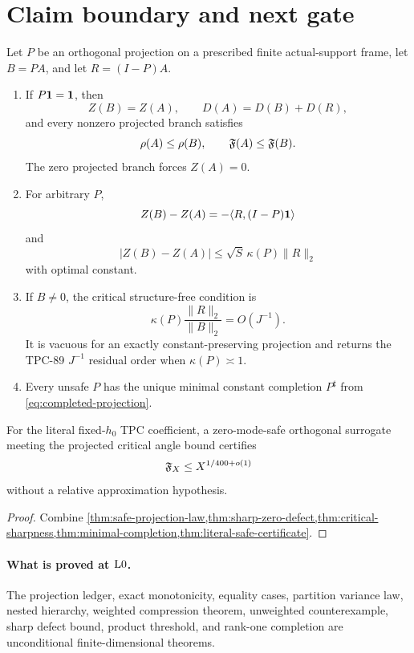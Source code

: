 \section{Claim boundary and next gate}
\label{sec:claim-boundary}

\begin{theorem}
\label{thm:audited-conclusion}
Let \(P\) be an orthogonal projection on a prescribed finite
actual-support frame, let \(B=PA\), and let \(R=(I-P)A\).
\begin{enumerate}[label=(\roman*),leftmargin=2.2em]
\item If \(P\mathbf 1=\mathbf 1\), then
  \[
  Z(B)=Z(A),\qquad
  D(A)=D(B)+D(R),
  \]
  and every nonzero projected branch satisfies
  \[
  \rho(A)\le\rho(B),\qquad
  \mathfrak F(A)\le\mathfrak F(B).
  \]
  The zero projected branch forces \(Z(A)=0\).
\item For arbitrary \(P\),
  \[
  Z(B)-Z(A)
  =
  -\langle R,(I-P)\mathbf 1\rangle
  \]
  and
  \[
  |Z(B)-Z(A)|
  \le
  \sqrt S\,\kappa(P)\|R\|_2
  \]
  with optimal constant.
\item If \(B\ne0\), the critical structure-free condition is
  \[
  \kappa(P)
  \frac{\|R\|_2}{\|B\|_2}
  =O(J^{-1}).
  \]
  It is vacuous for an exactly constant-preserving projection and
  returns the TPC-89 \(J^{-1}\) residual order when
  \(\kappa(P)\asymp1\).
\item Every unsafe \(P\) has the unique minimal constant completion
  \(P^\sharp\) from \eqref{eq:completed-projection}.
\end{enumerate}
For the literal fixed-\(h_0\) TPC coefficient, a zero-mode-safe
orthogonal surrogate meeting the projected critical angle bound
certifies
\[
 \mathfrak F_X\le X^{1/400+o(1)}
\]
without a relative approximation hypothesis.
\end{theorem}

\begin{proof}
Combine
\cref{thm:safe-projection-law,thm:sharp-zero-defect,thm:critical-sharpness,thm:minimal-completion,thm:literal-safe-certificate}.
\end{proof}

\paragraph{What is proved at \(\mathrm{L0}\).}
The projection ledger, exact monotonicity, equality cases, partition
variance law, nested hierarchy, weighted compression theorem,
unweighted counterexample, sharp defect bound, product threshold,
and rank-one completion are unconditional finite-dimensional
theorems.

